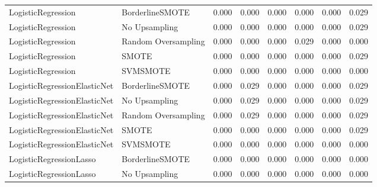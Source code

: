 \begin{tabular}{llllllll}
          LogisticRegression &     BorderlineSMOTE & 0.000 &                     0.000 &                 0.000 &                  0.000 &                                   0.000 &     0.029 \\
          LogisticRegression &       No Upsampling & 0.000 &                     0.000 &                 0.000 &                  0.000 &                                   0.000 &     0.029 \\
          LogisticRegression & Random Oversampling & 0.000 &                     0.000 &                 0.000 &                  0.029 &                                   0.000 &     0.000 \\
          LogisticRegression &               SMOTE & 0.000 &                     0.000 &                 0.000 &                  0.000 &                                   0.000 &     0.029 \\
          LogisticRegression &            SVMSMOTE & 0.000 &                     0.000 &                 0.000 &                  0.000 &                                   0.000 &     0.000 \\
LogisticRegressionElasticNet &     BorderlineSMOTE & 0.000 &                     0.029 &                 0.000 &                  0.000 &                                   0.000 &     0.029 \\
LogisticRegressionElasticNet &       No Upsampling & 0.000 &                     0.029 &                 0.000 &                  0.000 &                                   0.000 &     0.029 \\
LogisticRegressionElasticNet & Random Oversampling & 0.000 &                     0.029 &                 0.000 &                  0.000 &                                   0.000 &     0.029 \\
LogisticRegressionElasticNet &               SMOTE & 0.000 &                     0.000 &                 0.000 &                  0.000 &                                   0.000 &     0.029 \\
LogisticRegressionElasticNet &            SVMSMOTE & 0.000 &                     0.000 &                 0.000 &                  0.000 &                                   0.000 &     0.000 \\
     LogisticRegressionLasso &     BorderlineSMOTE & 0.000 &                     0.000 &                 0.000 &                  0.000 &                                   0.000 &     0.000 \\
     LogisticRegressionLasso &       No Upsampling & 0.000 &                     0.000 &                 0.000 &                  0.000 &                                   0.000 &     0.000 \\

\end{tabular}
